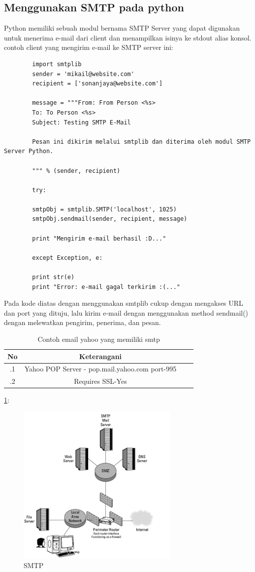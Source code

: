 \subsection {Menggunakan SMTP pada python}
Python memiliki sebuah modul bernama SMTP Server yang dapat digunakan untuk menerima e-mail dari client dan menampilkan isinya ke stdout alias konsol. 
	contoh client yang mengirim e-mail ke SMTP server ini:
	\begin {verbatim}
		import smtplib
		sender = 'mikail@website.com'
		recipient = ['sonanjaya@website.com']

		message = """From: From Person <%
		To: To Person <%
		Subject: Testing SMTP E-Mail

		Pesan ini dikirim melalui smtplib dan diterima oleh modul SMTP Server Python.

		""" %

		try:

   		smtpObj = smtplib.SMTP('localhost', 1025)
   		smtpObj.sendmail(sender, recipient, message)    

   		print "Mengirim e-mail berhasil :D..."

		except Exception, e:

		print str(e)
   		print "Error: e-mail gagal terkirim :(..."
	\end{verbatim}

Pada kode diatas dengan menggunakan smtplib cukup dengan mengakses URL dan port yang dituju, lalu kirim e-mail dengan menggunakan method sendmail() dengan melewatkan pengirim, penerima, dan pesan.

\begin{table}[ht]
	\caption{Contoh email yahoo yang memiliki smtp}
	\centering
	\begin{tabular}{cccc}
		\hline
		No&Keterangani&\\
		\hline
		.1&Yahoo POP Server - pop.mail.yahoo.com port-995&\\
		.2&Requires SSL-Yes&\\
		\hline
	\end{tabular}
\end{table}

\ref{smtp.png}:
\begin{figure}[ht]
	\centerline{\includegraphics[width=0.70\textwidth]{figures/smtp.png}}
	\caption{SMTP}
	\label{smtp.png}
\end{figure}

